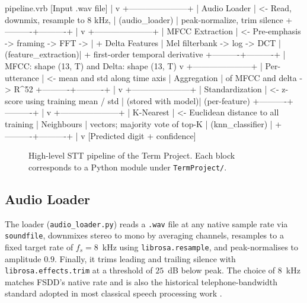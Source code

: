 \documentclass[12pt,a4paper]{article}
\begin{document}
\begin{VerbatimOut}{pipeline.vrb}
        [Input .wav file]
              |
              v
   +---------------------+
   |   Audio Loader      |  <- Read, downmix, resample to 8 kHz,
   |   (audio_loader)    |     peak-normalize, trim silence
   +----------+----------+
              |
              v
   +---------------------+
   |  MFCC Extraction    |  <- Pre-emphasis -> framing -> FFT ->
   |  + Delta Features   |     Mel filterbank -> log -> DCT
   |  (feature_extraction)|    + first-order temporal derivative
   +----------+----------+
              |   MFCC: shape (13, T) and Delta: shape (13, T)
              v
   +---------------------+
   |  Per-utterance      |  <- mean and std along time axis
   |  Aggregation        |     of MFCC and delta -> R^52
   +----------+----------+
              |
              v
   +---------------------+
   |  Standardization    |  <- z-score using training mean / std
   |  (stored with model)|     (per-feature)
   +----------+----------+
              |
              v
   +---------------------+
   |  K-Nearest          |  <- Euclidean distance to all training
   |  Neighbours         |     vectors; majority vote of top-K
   |  (knn_classifier)   |
   +----------+----------+
              |
              v
        [Predicted digit + confidence]
\end{VerbatimOut}

\begin{figure}[H]
\centering
{}
\caption{High-level STT pipeline of the Term Project. Each block corresponds to a Python module under \texttt{TermProject/}.}
\label{fig:pipeline}
\end{figure}

\subsection{Audio Loader}

The loader (\texttt{audio\_loader.py}) reads a \texttt{.wav} file at any
native sample rate via \texttt{soundfile}, downmixes stereo to mono by
averaging channels, resamples to a fixed target rate of $f_s = 8$~kHz using
\texttt{librosa.resample}, and peak-normalises to amplitude $0.9$. Finally, it
trims leading and trailing silence with \texttt{librosa.effects.trim} at a
threshold of $25$~dB below peak. The choice of 8~kHz matches FSDD's native
rate and is also the historical telephone-bandwidth standard adopted in most
classical speech processing work \cite{rabiner2007introduction}.
\end{document}

